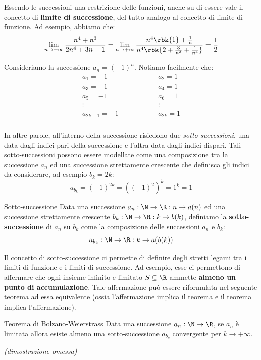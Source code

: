 \documentclass[a4paper, 12pt]{report}
\begin{document}
    \newpage

    Essendo le successioni una restrizione delle funzioni, anche su di essere vale il concetto di \textbf{limite di successione}, del tutto analogo al concetto di limite di funzione. Ad esempio, abbiamo che:
    \[\lim_{n \to +\infty} \frac{n^4 + n^3}{2n^4+3n+1} = \lim_{n \to +\infty} \frac{n^4 \rbk{1} + \frac{1}{n}}{n^4 \rbk{2+\frac{3}{n^3}+\frac{1}{n^4}}} = \frac{1}{2}\]

    Consideriamo la successione $a_n = (-1)^n$. Notiamo facilmente che:
    \[\begin{array}{ccc}
        a_1 = -1 & \qquad\qquad & a_2 = 1 \\
        a_3 = -1 & \qquad\qquad & a_4 = 1 \\
        a_5 = -1 & \qquad\qquad & a_6 = 1 \\
        \vdots   & \qquad\qquad & \vdots \\
        a_{2k+1} = -1 & \qquad\qquad & a_{2k} = 1 \\
    \end{array}\]

    In altre parole, all'interno della successione risiedono due \textit{sotto-successioni}, una data dagli indici pari della successione e l'altra data dagli indici dispari. Tali sotto-successioni possono essere modellate come una composizione tra la successione $a_n$ ed una successione strettamente crescente che definisca gli indici da considerare, ad esempio $b_k = 2k$:
    \[a_{b_k} = (-1)^{2k} = ((-1)^2)^k = 1^k = 1\]

    \begin{frameddefn}{Sotto-successione}
        Data una successione $a_n : \N \to \R : n \to a(n)$ ed una successione strettamente crescente $b_k : \N \to \R : k \to b(k)$, definiamo la \textbf{sotto-successione} di $a_n$ su $b_k$ come la composizione delle successioni $a_n$ e $b_k$:
        \[a_{b_k} : \N \to \R : k \to a(b(k))\]
    \end{frameddefn}
    
    Il concetto di sotto-successione ci permette di definire degli stretti legami tra i limiti di funzione e i limiti di successione. Ad esempio, esse ci permettono di affermare che ogni insieme infinito e limitato $S \subseteq \R$ ammette \textbf{almeno un punto di accumulazione}. Tale affermazione può essere riformulata nel seguente teorema ad essa equivalente (ossia l'affermazione implica il teorema e il teorema implica l'affermazione).
    
    \begin{framedthm}{Teorema di Bolzano-Weierstrass}
        Data una successione $a_n : \N \to \R$, se $a_n$ è limitata allora esiste almeno una sotto-successione $a_{b_k}$ convergente per $k \to +\infty$. 

        \textit{(dimostrazione omessa)}
    \end{framedthm}
\end{document}
